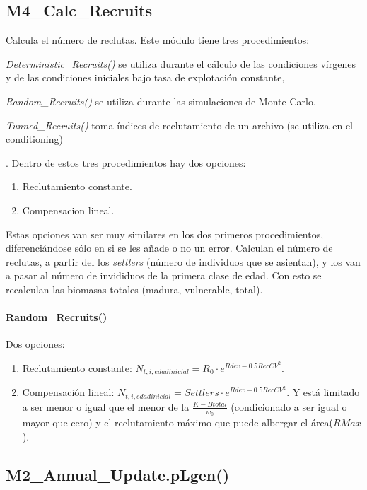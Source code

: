 		\subsection{M4\_Calc\_Recruits}
			Calcula el número de reclutas. Este módulo tiene tres procedimientos:\begin{inparaenum}[(i)] \item \emph{Deterministic\_Recruits()} se utiliza durante el cálculo de las condiciones vírgenes y de las condiciones iniciales bajo tasa de explotación constante, \item \emph{Random\_Recruits()} se utiliza durante las simulaciones de Monte-Carlo, \item \emph{Tunned\_Recruits()} toma índices de reclutamiento de un archivo (se utiliza en el conditioning) \end{inparaenum}.
			Dentro de estos tres procedimientos hay dos opciones: 
					\begin{enumerate}
						\item Reclutamiento constante. 
						\item Compensacion lineal.
					\end{enumerate}
			Estas opciones van ser muy similares en los dos primeros procedimientos, diferenciándose sólo en si se les añade o no un error. Calculan el número de reclutas, a partir del los \emph{settlers} (número de individuos que se asientan), y los van a pasar al número de invididuos de la primera clase de edad. Con esto se recalculan las biomasas totales (madura, vulnerable, total).
			\paragraph{Random\_Recruits()} 
				Dos opciones: 
					\begin{enumerate}
						\item Reclutamiento constante: $N_{t,i,edadinicial}= R_0 \cdot e^{Rdev-0.5 RecCV^2}$.
						\item Compensación lineal: $N_{t,i,edadinicial}=Settlers \cdot e^{Rdev-0.5 RecCV^2} $. Y está limitado a ser menor o igual que el menor de la $\frac{K - Btotal}{w_0}$ (condicionado a ser igual o mayor que cero) y el reclutamiento máximo que puede albergar el área($RMax$).
					\end{enumerate}
				
			
		\subsection{M2\_Annual\_Update.pLgen()}
